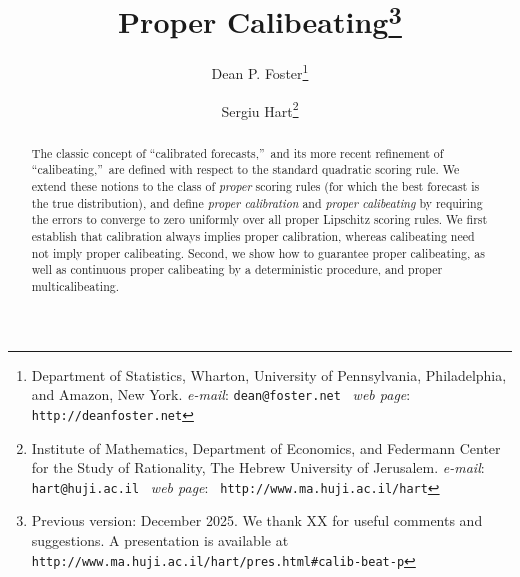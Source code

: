 \documentclass[12pt,a4paper,notitlepage]{article}
\begin{document}
\title{Proper Calibeating\thanks{%
Previous version: December 2025. We thank XX for useful comments and
suggestions. A presentation is available at \texttt{%
http://www.ma.huji.ac.il/hart/pres.html\#calib-beat-p}}}
\author{Dean P. Foster\thanks{%
Department of Statistics, Wharton, University of Pennsylvania, Philadelphia,
and Amazon, New York. \emph{e-mail}: \texttt{dean@foster.net} \ \emph{web
page}: \texttt{http://deanfoster.net}} \and Sergiu Hart\thanks{%
Institute of Mathematics, Department of Economics, and Federmann Center for
the Study of Rationality, The Hebrew University of Jerusalem. \emph{e-mail}: 
\texttt{hart@huji.ac.il} \ \emph{web page}: \texttt{%
http://www.ma.huji.ac.il/hart}}}
\maketitle

\begin{abstract}
The classic concept of \textquotedblleft calibrated
forecasts,\textquotedblright\ and its more recent refinement of
\textquotedblleft calibeating,\textquotedblright\ are defined with respect
to the standard quadratic scoring rule. We extend these notions to the class
of \emph{proper} scoring rules (for which the best forecast is the true
distribution), and define \emph{proper calibration} and \emph{proper
calibeating} by requiring the errors to converge to zero uniformly over all
proper Lipschitz scoring rules. We first establish that calibration always
implies proper calibration, whereas calibeating need not imply proper
calibeating. Second, we show how to guarantee proper calibeating, as well as
continuous proper calibeating by a deterministic procedure, and proper
multicalibeating.
\end{abstract}

\tableofcontents
\end{document}
